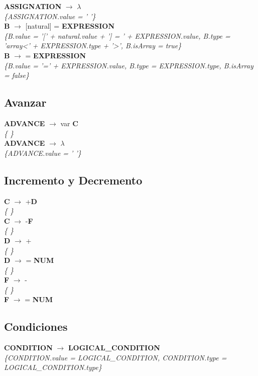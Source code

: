 \documentclass[10pt,a4paper]{article}
\begin{document}
\textbf{ASSIGNATION} $\rightarrow$ $\lambda$ \\
\textit{\{ASSIGNATION.value = ' '\}} \\

\textbf{B} $\rightarrow$ [natural] = \textbf{EXPRESSION}  \\
\textit{\{B.value = '[' + natural.value + '] = ' + EXPRESSION.value, B.type = 'array<' + EXPRESSION.type + '>', B.isArray = true\}} \\

\textbf{B} $\rightarrow$ = \textbf{EXPRESSION} \\
\textit{\{B.value = '=' + EXPRESSION.value, B.type = EXPRESSION.type, B.isArray = false\}} \\

\subsection{Avanzar}
\textbf{ADVANCE} $\rightarrow$ var \textbf{C} \\
\textit{\{   \}} \\

\textbf{ADVANCE} $\rightarrow$ $\lambda$ \\
\textit{\{ADVANCE.value = ' '\}} \\

\subsection{Incremento y Decremento}
\textbf{C} $\rightarrow$ +\textbf{D} \\ 
\textit{\{   \}} \\

\textbf{C} $\rightarrow$ -\textbf{F} \\
\textit{\{   \}} \\

\textbf{D} $\rightarrow$ +   \\
\textit{\{   \}} \\

\textbf{D} $\rightarrow$ = \textbf{NUM} \\
\textit{\{   \}} \\

\textbf{F} $\rightarrow$ - \\
\textit{\{   \}} \\

\textbf{F} $\rightarrow$ = \textbf{NUM} \\

\subsection{Condiciones}
\textbf{CONDITION} $\rightarrow$ \textbf{LOGICAL\_CONDITION}   \\
\textit{\{CONDITION.value = LOGICAL\_CONDITION,  CONDITION.type = LOGICAL\_CONDITION.type\}}\\
\end{document}
